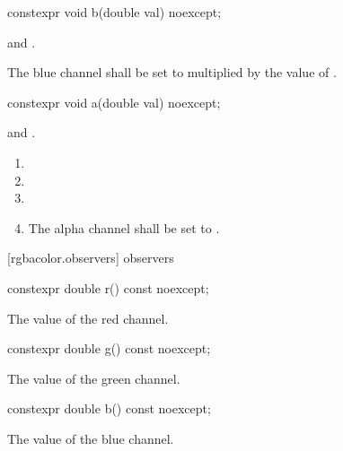 \begin{itemdecl}
constexpr void b(double val) noexcept;
\end{itemdecl}
\begin{itemdescr}
\pnum
\requires
{} and .

\pnum
\effects
The blue channel shall be set to  multiplied by the value of  .
\end{itemdescr}

\begin{itemdecl}
constexpr void a(double val) noexcept;
\end{itemdecl}
\begin{itemdescr}
\pnum
\requires
{} and .

\pnum
\effects
\begin{enumerate}
\item {}
\item {}
\item {}
\item The alpha channel shall be set to .
\end{enumerate}
\end{itemdescr}

 [rgbacolor.observers]{ observers}

\begin{itemdecl}
constexpr double r() const noexcept;
\end{itemdecl}
\begin{itemdescr}
\pnum
\returns
The value of the red channel.
\end{itemdescr}

\begin{itemdecl}
constexpr double g() const noexcept;
\end{itemdecl}
\begin{itemdescr}
\pnum
\returns
The value of the green channel.
\end{itemdescr}

\begin{itemdecl}
constexpr double b() const noexcept;
\end{itemdecl}
\begin{itemdescr}
\pnum
\returns
The value of the blue channel.
\end{itemdescr}

